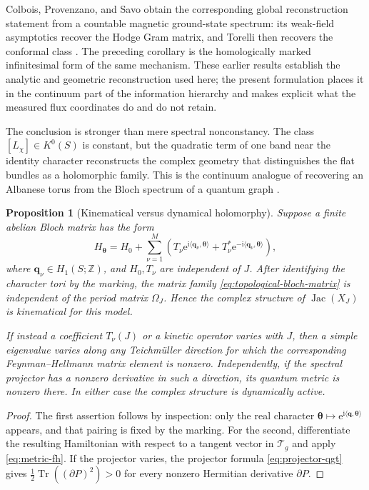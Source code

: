 \documentclass[11pt]{article}
\newtheorem{proposition}[theorem]{Proposition}
\theoremstyle{definition}
\theoremstyle{remark}
\newcommand{\ZZ}{\mathbb Z}
\newcommand{\Jac}{\operatorname{Jac}}
\newcommand{\Tr}{\operatorname{Tr}}
\newcommand{\cT}{\mathcal T}
\newcommand{\ii}{\mathrm i}
\newcommand{\e}{\mathrm e}
\begin{document}
Colbois, Provenzano, and Savo obtain the corresponding global reconstruction
statement from a countable magnetic ground-state spectrum: its weak-field
asymptotics recover the Hodge Gram matrix, and Torelli then recovers the
conformal class \cite{ColboisProvenzanoSavo2025}.  The preceding corollary is
the homologically marked infinitesimal form of the same mechanism.  These
earlier results establish the analytic and geometric reconstruction used
here; the present formulation places it in the continuum part of the
information hierarchy and makes explicit what the measured flux coordinates
do and do not retain.

The conclusion is stronger than mere spectral nonconstancy.  The class
\([L_\chi]\in K^0(S)\) is constant, but the quadratic term of one band near
the identity character reconstructs the complex geometry that distinguishes
the flat bundles as a holomorphic family.  This is the continuum analogue of
recovering an Albanese torus from the Bloch spectrum of a quantum graph
\cite{RueckriemenBloch}.

\begin{proposition}[Kinematical versus dynamical holomorphy]
\label{prop:kinematical-holomorphy}
Suppose a finite abelian Bloch matrix has the form
\[
 H_{\bm\theta}
   =H_0+\sum_{\nu=1}^M
      \left(T_\nu\e^{\ii\langle\bm q_\nu,\bm\theta\rangle}
      +T_\nu^*\e^{-\ii\langle\bm q_\nu,\bm\theta\rangle}\right),
 \tag{5.12}\label{eq:topological-bloch-matrix}
\]
where \(\bm q_\nu\in H_1(S;\ZZ)\), and \(H_0,T_\nu\) are independent of
\(J\).  After identifying the character tori by the marking, the matrix family
\eqref{eq:topological-bloch-matrix} is independent of the period matrix
\(\Omega_J\).  Hence the complex structure of \(\Jac(X_J)\) is kinematical
for this model.

If instead a coefficient \(T_\nu(J)\) or a kinetic operator varies with
\(J\), then a simple eigenvalue varies along any Teichm\"uller direction for
which the corresponding Feynman--Hellmann matrix element is nonzero.
Independently, if the spectral projector has a nonzero derivative in such a
direction, its quantum metric is nonzero there.  In either case the complex
structure is dynamically active.
\end{proposition}

\begin{proof}
The first assertion follows by inspection: only the real character
\(\bm\theta\mapsto\e^{\ii\langle\bm q,\bm\theta\rangle}\) appears, and that
pairing is fixed by the marking.  For the second, differentiate the resulting
Hamiltonian with respect to a tangent vector in \(\cT_g\) and apply
\eqref{eq:metric-fh}.  If the projector varies, the projector formula
\eqref{eq:projector-qgt} gives
\(\tfrac12\Tr((\partial P)^2)>0\) for every nonzero Hermitian derivative
\(\partial P\).
\end{proof}
\end{document}
